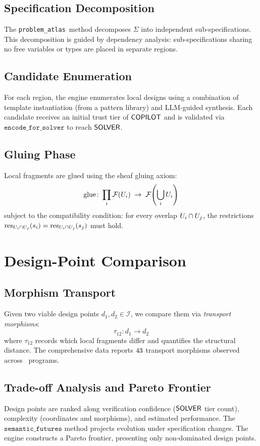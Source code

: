 \documentclass[11pt]{article}
\newcommand{\IdeationSpace}{\mathcal{I}}
\newcommand{\ProbAtlas}{\texttt{problem\_atlas}}
\begin{document}
\subsection{Specification Decomposition}
The \ProbAtlas\ method decomposes $\Sigma$ into independent
sub-specifications.  This decomposition is guided by dependency
analysis: sub-specifications sharing no free variables or types
are placed in separate regions.

\subsection{Candidate Enumeration}
For each region, the engine enumerates local designs using a
combination of template instantiation (from a pattern library) and
LLM-guided synthesis.  Each candidate receives an initial trust
tier of $\mathsf{COPILOT}$ and is validated via $\texttt{encode\_for\_solver}$
to reach $\mathsf{SOLVER}$.

\subsection{Gluing Phase}
Local fragments are glued using the sheaf gluing axiom:
\[
  \mathrm{glue}\colon \prod_{i} \mathcal{F}(U_i) \;\to\;
  \mathcal{F}\!\left(\bigcup_i U_i\right)
\]
subject to the compatibility condition: for every overlap
$U_i \cap U_j$, the restrictions $\mathrm{res}_{U_i \cap U_j}(s_i)
= \mathrm{res}_{U_i \cap U_j}(s_j)$ must hold.

\section{Design-Point Comparison}\label{sec:comparison}

\subsection{Morphism Transport}
Given two viable design points $d_1, d_2 \in \IdeationSpace$, we
compare them via \emph{transport morphisms}:
\[
  \tau_{12}\colon d_1 \to d_2
\]
where $\tau_{12}$ records which local fragments differ and quantifies
the structural distance.  The comprehensive data reports
$43$ transport morphisms observed across
\compTotalPrograms\ programs.

\subsection{Trade-off Analysis and Pareto Frontier}
Design points are ranked along verification confidence ($\mathsf{SOLVER}$
tier count), complexity (coordinates and morphisms), and estimated
performance.  The $\texttt{semantic\_futures}$ method projects
evolution under specification changes.  The engine constructs a
Pareto frontier, presenting only non-dominated design points.
\end{document}
